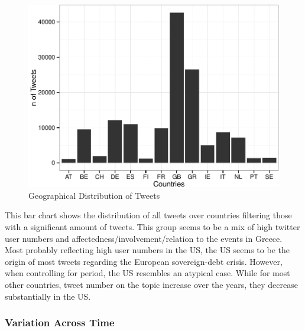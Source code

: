 \documentclass[]{article}
\begin{document}
\begin{figure}

{\centering \includegraphics{fin_paper_files/figure-latex/unnamed-chunk-3-1} 

}

\caption{Geographical Distribution of Tweets}\label{fig:unnamed-chunk-3}
\end{figure}

This bar chart shows the distribution of all tweets over countries
filtering those with a significant amount of tweets. This group seems to
be a mix of high twitter user numbers and
affectedness/involvement/relation to the events in Greece. Most probably
reflecting high user numbers in the US, the US seems to be the origin of
most tweets regarding the European sovereign-debt crisis. However, when
controlling for period, the US resembles an atypical case. While for
most other countries, tweet number on the topic increase over the years,
they decrease substantially in the US.

\subsubsection{Variation Across Time}\label{variation-across-time}
\end{document}
